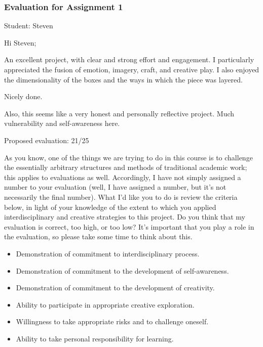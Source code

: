 \documentclass[letterpaper,10pt,DIV=9,headsepline]{scrreprt}
\begin{document}
\newpage

\subsubsection{Evaluation for Assignment 1}

Student: Steven

\bigskip
Hi Steven;

An excellent project, with clear and strong effort and engagement. I
particularly appreciated the fusion of emotion, imagery, craft, and
creative play. I also enjoyed the dimensionality of the boxes and the ways in which the piece was layered.

Nicely done.

Also, this seems like a very honest and personally reflective project.
Much vulnerability and self-awareness here.



\bigskip
Proposed evaluation: 21/25

\bigskip
As you know, one of the things we are trying to do in this course is
to challenge the essentially arbitrary structures and methods of
traditional academic work; this applies to evaluations as well.
Accordingly, I have not simply assigned a number to your evaluation
(well, I have assigned a number, but it's not necessarily the final
number). What I'd like you to do is review the criteria below, in
light of your knowledge of the extent to which you applied
interdisciplinary and creative strategies to this project. Do you
think that my evaluation is correct, too high, or too low? It's
important that you play a role in the evaluation, so please take some
time to think about this.

\begin{itemize}
\item Demonstration of commitment to interdisciplinary process.
\item Demonstration of commitment to the development of self-awareness.
\item Demonstration of commitment to the development of creativity.
\item Ability to participate in appropriate creative exploration.
\item Willingness to take appropriate risks and to challenge oneself.
\item Ability to take personal responsibility for learning.
\end{itemize}
\end{document}

